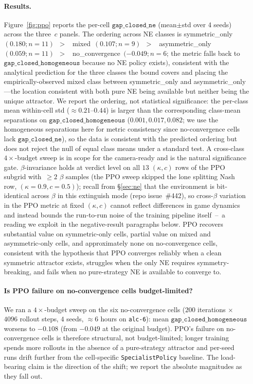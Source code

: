 \documentclass{anvil-paper}
\begin{document}
\paragraph{Results.}
Figure~\ref{fig:ppo} reports the per-cell $\texttt{gap\_closed\_ne}$
(mean$\pm$std over 4 seeds) across the three~$c$ panels. The ordering across
NE classes is
\textsf{symmetric\_only}~$(0.180;n{=}11)$~$>$~%
\textsf{mixed}~$(0.107;n{=}9)$~$>$~%
\textsf{asymmetric\_only}~$(0.059;n{=}11)$~$>$~%
\textsf{no\_convergence}~$(-0.049;n{=}6$; the metric falls back to
$\texttt{gap\_closed\_homogeneous}$ because no NE policy exists$)$,
consistent with the analytical prediction for the three classes the
bound covers and placing the empirically-observed \textsf{mixed} class
between \textsf{symmetric\_only} and \textsf{asymmetric\_only}---the
location consistent with both pure NE being available but neither being
the unique attractor. We report the ordering, not statistical
significance: the per-class mean within-cell std
($\approx 0.21$--$0.44$) is larger than the corresponding
class-mean separations on $\texttt{gap\_closed\_homogeneous}$
($0.001, 0.017, 0.082$; we use the homogeneous separations here for
metric consistency since no-convergence cells lack
$\texttt{gap\_closed\_ne}$), so the data is consistent with the
predicted ordering but does not reject the null of equal class means
under a standard test. A cross-class $4{\times}$-budget sweep is in
scope for the camera-ready and is the natural significance gate.
$\beta$-invariance holds at verdict level on all $13$ $(\kappa,c)$ rows
of the PPO subgrid with~$\geq 2$ $\beta$ samples (the PPO sweep skipped
the lone splitting Nash row, $(\kappa{=}0.9, c{=}0.5)$); recall from
\S\ref{sec:ne} that the environment is bit-identical across $\beta$ in
this extinguish mode (repo issue~\#442), so cross-$\beta$ variation in
the PPO metric at fixed $(\kappa,c)$ cannot reflect differences in game
dynamics and instead bounds the run-to-run noise of the training
pipeline itself~--~a reading we exploit in the negative-result
paragraphs below. PPO recovers substantial value on
symmetric-only cells, partial value on mixed and asymmetric-only cells,
and approximately none on no-convergence cells, consistent with the
hypothesis that PPO converges reliably when a clean symmetric attractor
exists, struggles when the only NE requires symmetry-breaking, and fails
when no pure-strategy NE is available to converge to.

\paragraph{Is PPO failure on no-convergence cells budget-limited?}
We ran a $4{\times}$-budget sweep on the six no-convergence cells
($200$ iterations $\times$ $4096$ rollout steps, $4$ seeds, $\approx 6$ hours
on \texttt{alc-6}): mean $\texttt{gap\_closed\_homogeneous}$ worsens to
$-0.108$ (from $-0.049$ at the original budget). PPO's failure on
no-convergence cells is therefore structural, not budget-limited; longer
training spends more rollouts in the absence of a pure-strategy attractor
and per-seed runs drift further from the cell-specific
\texttt{SpecialistPolicy} baseline. The load-bearing claim is the direction
of the shift; we report the absolute magnitudes as they fall out.
\end{document}
